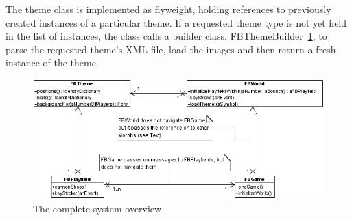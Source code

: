 The theme class is implemented as flyweight, holding references to previously 
created instances of a particular theme. If a requested theme type is not yet 
held in the list of instances, the class calls a builder class, 
FBThemeBuilder~\ref{fig:system}, to parse the requested theme's XML file, 
load the images and then return a fresh instance of the theme.
%
\begin{figure}[bt]
  \begin{center}
    \includegraphics[width=0.9\linewidth]{images/architecture.png}
  \end{center}
  \caption{The complete system overview}
  \label{fig:system}
\end{figure}
%

